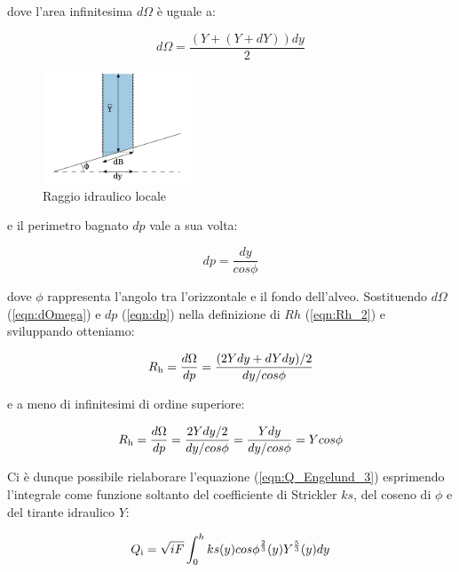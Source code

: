 \documentclass[12pt]{article} %
\begin{document}
\noindent dove l'area infinitesima $d\Omega$ è uguale a:

\begin{equation}
    d\Omega=\frac{(Y+(Y+dY))dy}{2}
    \label{eqn:dOmega}
\end{equation}

\begin{figure}
    \centering
    \includegraphics[width=0.4\textwidth]{Rh locale.png}
    \caption{Raggio idraulico locale}
    \label{fig:Rh locale}
\end{figure}

\noindent e il perimetro bagnato $dp$ vale a sua volta:

\begin{equation}
    dp=\frac{dy}{cos\phi}
    \label{eqn:dp}
\end{equation}

\noindent dove $\phi$ rappresenta l’angolo tra l’orizzontale e il fondo dell’alveo. Sostituendo $d\Omega$ (\ref{eqn:dOmega}) e $dp$ (\ref{eqn:dp}) nella definizione di $Rh$ (\ref{eqn:Rh_2}) e sviluppando otteniamo:

\begin{equation}
    R\textsubscript{h}=\frac{d\Omega}{dp}=\frac{(2Ydy+dYdy)/2}{dy/cos\phi}
    \label{eqn:Rh_3}
\end{equation}

\noindent e a meno di infinitesimi di ordine superiore:

\begin{equation}
    R\textsubscript{h}=\frac{d\Omega}{dp}=\frac{2Ydy/2}{dy/cos\phi}=\frac{Ydy}{dy/cos\phi}=Ycos\phi
    \label{eqn:Rh_4}
\end{equation}

\noindent Ci è dunque possibile rielaborare l’equazione (\ref{eqn:Q_Engelund_3}) esprimendo l’integrale come funzione soltanto del coefficiente di Strickler $ks$, del coseno di $\phi$ e del tirante idraulico $Y$:

\begin{equation}
    Q\textsubscript{i}=\sqrt{iF}\int_{0}^{h} ks(y)cos\phi^{\frac{2}{3}}(y)Y^{\frac{5}{3}}(y)dy
    \label{eqn:Q_Engelund_4}
\end{equation}
\end{document}
